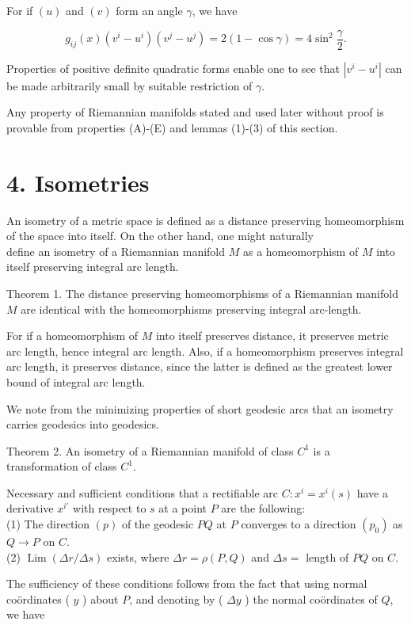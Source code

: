 \documentclass[10pt]{article}
\begin{document}
For if $(u)$ and $(v)$ form an angle $\gamma$, we have

$$
g_{i j}(x)\left(v^{i}-u^{i}\right)\left(v^{j}-u^{j}\right)=2(1-\cos \gamma)=4 \sin ^{2} \frac{\gamma}{2} .
$$

Properties of positive definite quadratic forms enable one to see that $\left|v^{i}-u^{i}\right|$ can be made arbitrarily small by suitable restriction of $\gamma$.

Any property of Riemannian manifolds stated and used later without proof is provable from properties (A)-(E) and lemmas (1)-(3) of this section.

\section*{4. Isometries}
An isometry of a metric space is defined as a distance preserving homeomorphism of the space into itself. On the other hand, one might naturally\\
define an isometry of a Riemannian manifold $M$ as a homeomorphism of $M$ into itself preserving integral arc length.

Theorem 1. The distance preserving homeomorphisms of a Riemannian manifold $M$ are identical with the homeomorphisms preserving integral arc-length.

For if a homeomorphism of $M$ into itself preserves distance, it preserves metric arc length, hence integral arc length. Also, if a homeomorphism preserves integral arc length, it preserves distance, since the latter is defined as the greatest lower bound of integral arc length.

We note from the minimizing properties of short geodesic arcs that an isometry carries geodesics into geodesics.

Theorem 2. An isometry of a Riemannian manifold of class $C^{1}$ is a transformation of class $C^{1}$.

Necessary and sufficient conditions that a rectifiable arc $C: x^{i}=x^{i}(s)$ have a derivative $x^{i \prime}$ with respect to $s$ at a point $P$ are the following:\\
(1) The direction $(p)$ of the geodesic $P Q$ at $P$ converges to a direction $\left(p_{0}\right)$ as $Q \rightarrow P$ on $C$.\\
(2) $\operatorname{Lim}(\Delta r / \Delta s)$ exists, where $\Delta r=\rho(P, Q)$ and $\Delta s=$ length of $P Q$ on $C$.

The sufficiency of these conditions follows from the fact that using normal coördinates ( $y$ ) about $P$, and denoting by ( $\Delta y$ ) the normal coördinates of $Q$, we have
\end{document}
